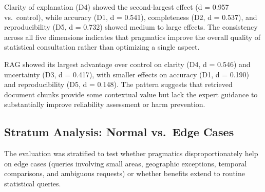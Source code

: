 \documentclass[
  11pt,
  letterpaper,
]{article}
\begin{document}
Clarity of explanation (D4) showed the second-largest effect (d = 0.957
vs.~control), while accuracy (D1, d = 0.541), completeness (D2, d =
0.537), and reproducibility (D5, d = 0.732) showed medium to large
effects. The consistency across all five dimensions indicates that
pragmatics improve the overall quality of statistical consultation
rather than optimizing a single aspect.

RAG showed its largest advantage over control on clarity (D4, d = 0.546)
and uncertainty (D3, d = 0.417), with smaller effects on accuracy (D1, d
= 0.190) and reproducibility (D5, d = 0.148). The pattern suggests that
retrieved document chunks provide some contextual value but lack the
expert guidance to substantially improve reliability assessment or harm
prevention.

\subsection{Stratum Analysis: Normal vs.~Edge
Cases}\label{stratum-analysis-normal-vs.-edge-cases}

The evaluation was stratified to test whether pragmatics
disproportionately help on edge cases (queries involving small areas,
geographic exceptions, temporal comparisons, and ambiguous requests) or
whether benefits extend to routine statistical queries.
\end{document}
